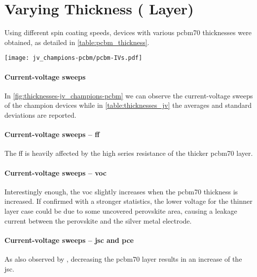 \section{Varying  Thickness ( Layer)}
Using different spin coating speeds, devices with various \gls{pcbm70} thicknesses were obtained, as detailed in \cref{table:pcbm_thickness}.

\begin{SCfigure}
	\centering
	\texttt{[image: jv\_champions-pcbm/pcbm-IVs.pdf]}
	\label{fig:thicknesses-jv_champions-pcbm}
\end{SCfigure}

\paragraph{Current-voltage sweeps}
In \cref{fig:thicknesses-jv_champions-pcbm} we can observe the current-voltage sweeps of the champion devices while in \cref{table:thicknesses_jv} the averages and standard deviations are reported.



\paragraph{Current-voltage sweeps -- \gls{ff}}
The \gls{ff} is heavily affected by the high series resistance of the thicker \gls{pcbm70} layer.


\paragraph{Current-voltage sweeps -- \gls{voc}}
Interestingly enough, the \gls{voc} slightly increases when the \gls{pcbm70} thickness is increased.
If confirmed with a stronger statistics, the lower voltage for the thinner layer case could be due to some uncovered perovskite area, causing a leakage current between the perovskite and the silver metal electrode.

\paragraph{Current-voltage sweeps -- \gls{jsc} and \gls{pce}}
As also observed by , decreasing the \gls{pcbm70} layer results in an increase of the \gls{jsc}.

